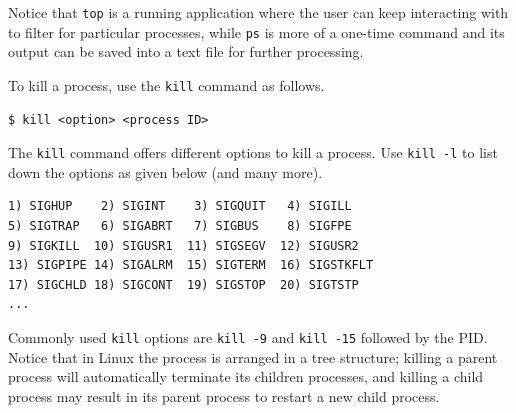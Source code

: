 Notice that \verb|top| is a running application where the user can keep interacting with to filter for particular processes, while \verb|ps| is more of a one-time command and its output can be saved into a text file for further processing.

To kill a process, use the \verb|kill| command as follows.
\begin{lstlisting}
$ kill <option> <process ID>
\end{lstlisting}

The \verb|kill| command offers different options to kill a process. Use \verb|kill -l| to list down the options as given below (and many more).
\begin{lstlisting}
1) SIGHUP    2) SIGINT    3) SIGQUIT   4) SIGILL
5) SIGTRAP   6) SIGABRT   7) SIGBUS    8) SIGFPE
9) SIGKILL  10) SIGUSR1  11) SIGSEGV  12) SIGUSR2
13) SIGPIPE 14) SIGALRM	 15) SIGTERM  16) SIGSTKFLT
17) SIGCHLD 18) SIGCONT	 19) SIGSTOP  20) SIGTSTP
...
\end{lstlisting}

Commonly used \verb|kill| options are \verb|kill -9| and \verb|kill -15| followed by the PID. Notice that in Linux the process is arranged in a tree structure; killing a parent process will automatically terminate its children processes, and killing a child process may result in its parent process to restart a new child process.
